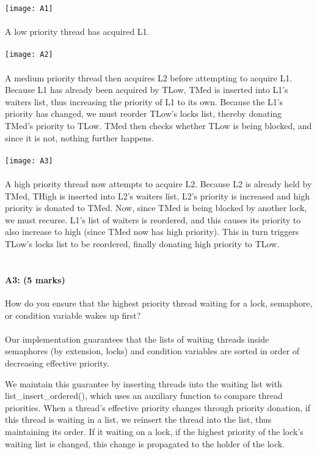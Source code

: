 \newpage
\texttt{[image: A1]}
\\
\\
A low priority thread has acquired L1.
\\
\\
\texttt{[image: A2]}
\\
\\
A medium priority thread then acquires L2 before attempting to acquire L1. Because L1 has already been acquired by TLow, TMed is inserted into L1's waiters list, thus increasing the priority of L1 to its own. Because the L1's priority has changed, we must reorder TLow's locks list, thereby donating TMed's priority to TLow. TMed then checks whether TLow is being blocked, and since it is not, nothing further happens.
\\
\\
\texttt{[image: A3]}
\\
\\
A high priority thread now attempts to acquire L2. Because L2 is already held by TMed, THigh is inserted into L2's waiters list, L2's priority is increased and high priority is donated to TMed. Now, since TMed is being blocked by another lock, we must recurse. L1's list of waiters is reordered, and this causes its priority to also increase to high (since TMed now has high priority). This in turn triggers TLow's locks list to be reordered, finally donating high priority to TLow.
\\
\\
\paragraph{A3: (5 marks)}
How do you ensure that the highest priority thread waiting for a lock, semaphore, or condition variable wakes up first?
\\
\\
Our implementation guarantees that the lists of waiting threads inside semaphores (by extension, locks) and condition variables are sorted in order of decreasing effective priority.

We maintain this guarantee by inserting threads into the waiting list with list\_insert\_ordered(), which uses an auxiliary function to compare thread priorities.
When a thread's effective priority changes through priority donation, if this thread is waiting in a list, we reinsert the thread into the list, thus maintaining its order. If it waiting on a lock, if the highest priority of the lock's waiting list is changed, this change is propagated to the holder of the lock.

